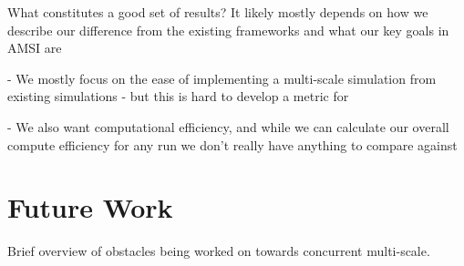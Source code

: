 \documentclass[review]{siamart1116}
\begin{document}
What constitutes a good set of results? It likely mostly depends on how we describe our difference from the existing frameworks and what our key goals in AMSI are

  - We mostly focus on the ease of implementing a multi-scale simulation from existing simulations - but this is hard to develop a metric for
  
  - We also want computational efficiency, and while we can calculate our overall compute efficiency for any run we don't really have anything to compare against

\section{Future Work}\label{sec:future-work}

Brief overview of obstacles being worked on towards concurrent multi-scale.



\end{document}
